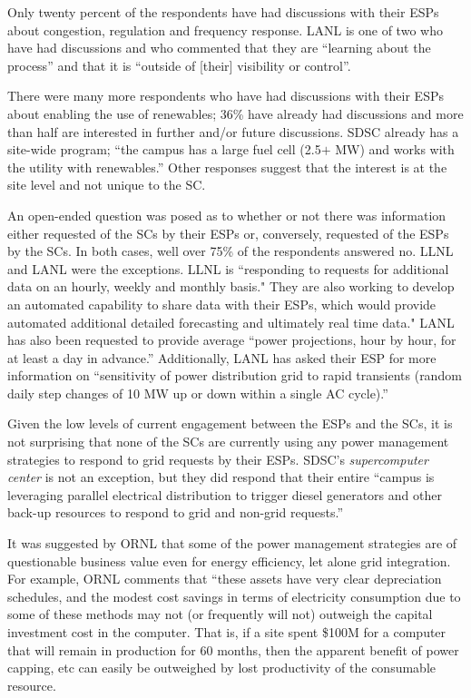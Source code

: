 Only twenty percent of the respondents have had discussions with their
ESPs about congestion, regulation and frequency
response. LANL is one of two who have had discussions and who commented that
they are ``learning about the process'' and that it is ``outside of [their] visibility or control''.

There were many more respondents who have had discussions with their
ESPs about enabling the use of renewables; 36{\%}
have already had discussions and more than half are interested in further
and/or future discussions. SDSC already has a site-wide program; ``the
campus has a large fuel cell (2.5$+$ MW) and works with the utility with
renewables.'' Other responses suggest that the interest is at the site level
and not unique to the SC.

An open-ended question was posed as to whether or not there was information
either requested of the SCs by their ESPs or,
conversely, requested of the ESPs by the SCs. In both cases, well
over 75{\%} of the respondents answered no. LLNL and LANL were the
exceptions. LLNL is ``responding to requests for additional data on an hourly, 
weekly and monthly basis." They are also working to develop an automated capability to share 
data with their ESPs, which would provide automated additional 
detailed forecasting and ultimately real time data."
LANL has also been requested to provide average ``power projections, hour by hour,
for at least a day in advance.'' Additionally, LANL has asked their ESP for
more information on ``sensitivity of power distribution grid to rapid
transients (random daily step changes of 10 MW up or down within a single AC
cycle).''

Given the low levels of current engagement between the ESPs and the SCs, it is not surprising that none of
the SCs are currently using any power management
strategies to respond to grid requests by their ESPs. SDSC's \textit{supercomputer center} is not an exception, but they did respond that their
entire ``campus is leveraging parallel electrical distribution to trigger
diesel generators and other back-up resources to respond to grid and
non-grid requests.''

It was suggested by ORNL that some of the power management strategies 
are of questionable business value even for energy efficiency, let alone grid integration.
For example, ORNL comments that ``these assets have very clear depreciation schedules, and the modest cost 
savings in terms of electricity consumption due to some of these methods may not (or frequently will not) 
outweigh the capital investment cost in the computer. That is, if a site spent \$100M for a computer that will 
remain in production for 60 months, then the 
apparent benefit of power capping, etc can easily be outweighed by lost productivity of the consumable resource.

